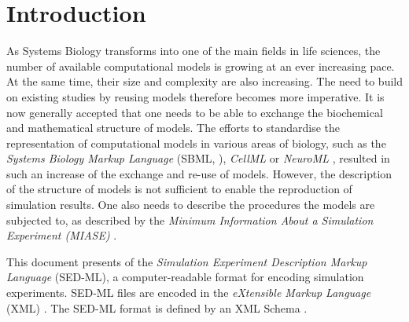\chapter{Introduction}

As Systems Biology transforms into one of the main fields in life sciences, the number of available computational models is growing at an ever increasing pace. At the same time, their size and complexity are also increasing. The need to build on existing studies by reusing models therefore becomes more imperative. It is now generally accepted that one needs to be able to exchange the biochemical and mathematical structure of models. The efforts to standardise the representation of computational models in various areas of biology, such as the \emph{Systems Biology Markup Language} (SBML, \citet{Hucka:2003}), \emph{CellML} \citep{Lloyd:2004} or \emph{NeuroML} \citet{Goddard:2001}, resulted in such an increase of the exchange and re-use of models. However, the description of the structure of models is not sufficient to enable the reproduction of simulation results.  One also needs to describe the procedures the models are subjected to, as described by the \emph{Minimum Information About a Simulation Experiment (MIASE)} \citep{Waltemath:2011}. 

This document presents  \LoneVone of the \emph{Simulation Experiment Description Markup Language} (SED-ML), a computer-readable format for encoding simulation experiments. SED-ML files are encoded in the \emph{eXtensible Markup Language} (XML) \citep{Bray:2006}. The SED-ML format is defined by an XML Schema \citep{Fallside:2001}. 






